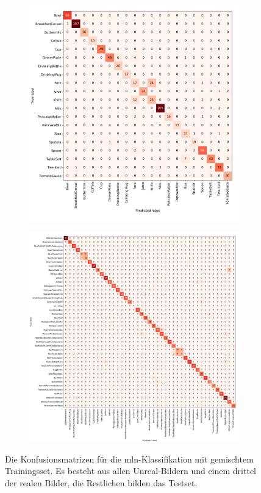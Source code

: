 \begin{figure}
\centering
	\begin{subfigure}[b]{1\textwidth}
	\centering
	\includegraphics[scale=.29]{img/chapter6/UnrealRealMixedGTClass.png}
	\end{subfigure}
	\begin{subfigure}[b]{1\textwidth}
	\centering
	\includegraphics[scale=.29]{img/chapter6/UnrealRealMixedGTInstance.png}
	\end{subfigure}
\caption[Die Konfusionsmatrizen der Klassifikation mit gemischtem Trainingsset und realem Testset]{Die Konfusionsmatrizen für die \gls{mln}-Klassifikation mit gemischtem Trainingsset. Es besteht aus allen Unreal-Bildern und einem drittel der realen Bilder, die Restlichen bilden das Testset.}
\label{fig:UnrealRealMixed_confMatrices}
\end{figure}

